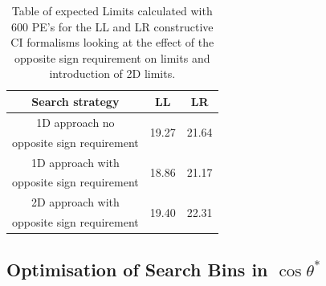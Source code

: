     \begin {table}[h]
        \begin{center}
        \begin{tabular}{ | c | c | c | } 
            \hline
            \hline
            Search strategy & LL & LR \\
            \hline
            1D approach no & \multirow{2}{*}{19.27} & \multirow{2}{*}{21.64} \\
            opposite sign requirement & & \\
            1D approach with & \multirow{2}{*}{18.86} & \multirow{2}{*}{21.17} \\
            opposite sign requirement & & \\
            2D approach with & \multirow{2}{*}{19.40} & \multirow{2}{*}{22.31} \\
            opposite sign requirement & & \\
            \hline
            \hline
        \end{tabular}
        \caption{Table of expected Limits calculated with 600 PE's for the LL and LR constructive CI formalisms looking at the effect of the opposite sign requirement on limits and introduction of 2D limits.}
        \label{tab:limits_oppSign}
        \end{center}
    \end {table}



\subsection{Optimisation of Search Bins in $\cos{\theta^{*}}$}
    \label{sec:binOpp}

